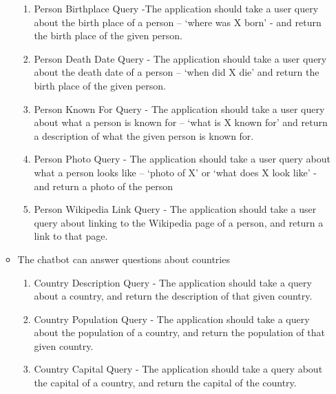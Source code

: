 \begin{itemize}
\begin{itemize}
\begin{enumerate}[resume*]
			\item Person Birthplace Query -The application should take a user query about the birth place of a person – ‘where was X born’ -  and return the birth place of the given person. 
			\item Person Death Date Query - The application should take a user query about the death date of a person – ‘when did X die’ and return the birth place of the given person. 
			\item Person Known For Query - The application should take a user query about what a person is known for – ‘what is X known for’ and return a description of what the given person is known for.
			\item Person Photo Query - The application should take a user query about what a person looks like – ‘photo of X’ or ‘what does X look like’ - and return a photo of the person
			\item Person Wikipedia Link Query - The application should take a user query about linking to the Wikipedia page of a person, and return a link to that page.
		\end{enumerate}
		\item The chatbot can answer questions about countries
		\begin{enumerate}[resume*]
			\item Country Description Query - The application should take a query about a country, and return the description of that given country.
			\item Country Population Query - The application should take a query about the population of a country, and return the population of that given country.
			\item Country Capital Query - The application should take a query about the capital of a country, and return the capital of the country.
			

\end{enumerate}
\end{itemize}
\end{itemize}
